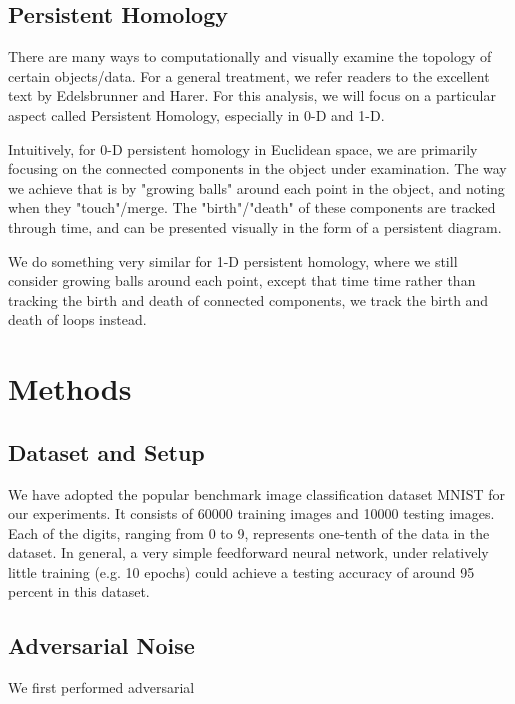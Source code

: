 \documentclass[twoside,twocolumn]{article}
\begin{document}

\subsection{Persistent Homology}

There are many ways to computationally and visually examine the topology of certain objects/data. For a general treatment, we refer readers to the excellent text by Edelsbrunner and Harer. For this analysis, we will focus on a particular aspect called Persistent Homology, especially in 0-D and 1-D. 

Intuitively, for 0-D persistent homology in Euclidean space, we are primarily focusing on the connected components in the object under examination. The way we achieve that is by "growing balls" around each point in the object, and noting when they "touch"/merge. The "birth"/"death" of these components are tracked through time, and can be presented visually in the form of a persistent diagram. 

We do something very similar for 1-D persistent homology, where we still consider growing balls around each point, except that time time rather than tracking the birth and death of connected components, we track the birth and death of loops instead. 

\section{Methods}

\subsection{Dataset and Setup}
We have adopted the popular benchmark image classification dataset MNIST for our experiments. It consists of 60000 training images and 10000 testing images. Each of the digits, ranging from 0 to 9, represents one-tenth of the data in the dataset. In general, a very simple feedforward neural network, under relatively little training (e.g. 10 epochs) could achieve a testing accuracy of around 95 percent in this dataset. 

\subsection{Adversarial Noise}
We first performed adversarial 
\end{document}
